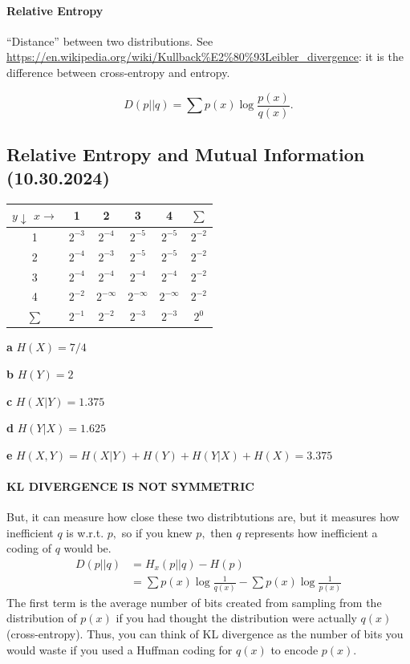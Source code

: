\documentclass[12pt]{article}
\begin{document}
\paragraph{Relative Entropy}
``Distance'' between two distributions. See \url{https://en.wikipedia.org/wiki/Kullback%E2%80%93Leibler_divergence}: it is the difference between cross-entropy and entropy.

\[D(p||q)=\sum p(x)\log\frac{p(x)}{q(x)}.\]


\subsection{Relative Entropy and Mutual Information (10.30.2024)}

\begin{tabular}{c|c|c|c|c|c}
    $y \downarrow$ $x \rightarrow$ & 1 & 2 & 3 & 4 & $\sum$ \\
    \hline
    1 & $2^{-3}$ & $2^{-4}$ & $2^{-5}$ & $2^{-5}$ & $2^{-2}$\\
    \hline
    2 & $2^{-4}$ & $2^{-3}$ & $2^{-5}$ & $2^{-5}$ & $2^{-2}$ \\
    \hline
    3 & $2^{-4}$ & $2^{-4}$ & $2^{-4}$ & $2^{-4}$ & $2^{-2}$ \\
    \hline
    4 & $2^{-2}$ & $2^{-\infty}$ & $2^{-\infty}$ & $2^{-\infty}$ & $2^{-2}$ \\
    \hline
    $\sum$ & $2^{-1}$ & $2^{-2}$ & $2^{-3}$ & $2^{-3}$ & $2^{0}$ \\
    
\end{tabular}
\medskip

\textbf{a} $H(X) = 7/4$

\textbf{b} $H(Y) = 2$

\textbf{c} $H(X|Y)=1.375$

\textbf{d} $H(Y|X)=1.625$

\textbf{e} $H(X,Y)=H(X|Y)+H(Y)+H(Y|X)+H(X)=3.375$


\paragraph{KL DIVERGENCE IS NOT SYMMETRIC} But, it can measure how close these two distribtutions are, but it measures how inefficient $q$ is w.r.t. $p,$ so if you knew $p,$ then $q$ represents how inefficient a coding of $q$ would be.
\begin{align*} 
D(p||q) &= H_x (p || q) - H(p) \\
&= \sum p(x) \log \frac{1}{q(x)} - \sum p(x) \log \frac{1}{p(x)}
\end{align*}
The first term is the average number of bits created from sampling from the distribution of $p(x)$ if you had thought the distribution were actually $q(x)$ (cross-entropy). Thus, you can think of KL divergence as the number of bits you would waste if you used a Huffman coding for $q(x)$ to encode $p(x)$.
\end{document}
